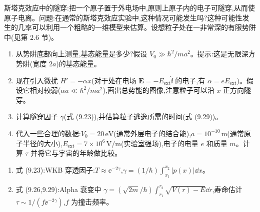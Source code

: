 \begin{question}
斯塔克效应中的隧穿:把一个原子置于外电场中,原则上原子内的电子可隧穿,从而使原子电离。问题:在通常的斯塔克效应实验中,这种情况可能发生吗?这种可能性发生的几率可以利用一个粗略的一维模型来估算。设想粒子处在一非常深的有限势阱中(见第 2.6 节)。
\begin{enumerate}
\item 从势阱底部向上测量,基态能量是多少?假设 $V_0\gg\hbar^2/ma^2$。提示:这是无限深方势阱(宽度 $2a$)的基态能量。
\item 现在引入微扰 $H'=-\alpha x$(对于处在电场 $\mathbf E=-E_{\mathrm{ext}}\hat{\mathbf \ii}$ 的电子,有 $\alpha=eE_{\mathrm{ext}}$)。假设它相对较弱($\alpha a\ll\hbar^2/ma^2$),画出总势能的图像,注意粒子可以沿 $x$ 正方向隧穿。
\item 计算隧穿因子 $\gamma$(式 (9.23)),并估算粒子逃逸所需的时间(式 (9.29))。
\item 代入一些合理的数据:$V_0=20\,\mathrm{eV}$(通常外层电子的结合能),$a=10^{-10}\,\mathrm{m}$(通常原子半径的大小),$E_{\mathrm{ext}}=7\times10^6\,\mathrm{V/m}$(实验室强场),电子的电量 $e$ 和质量 $m$。计算 $\tau$ 并将它与宇宙的年龄做比较。
\end{enumerate}

\par\smallskip
{}
\begin{enumerate}[leftmargin=2.2em,itemsep=0.12em,topsep=0.12em,parsep=0pt]
\item 式 (9.23):WKB 穿透因子:$T\approx \ee^{-2\gamma}$,$\gamma=(1/\hbar)\int_{x_1}^{x_2}|p(x)|\dd x$。
\item 式 (9.26,9.29):Alpha 衰变中 $\gamma=(\sqrt{2m}/\hbar)\int_{r_1}^{r_2}\sqrt{V(r)-E}\dd r$,寿命估计 $\tau\sim 1/(f \ee^{-2\gamma})$,$f$ 为撞击频率。
\end{enumerate}

\end{question}
